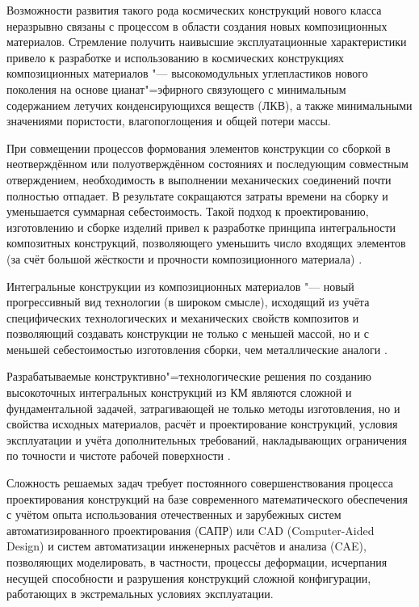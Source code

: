 Возможности развития такого рода космических конструкций нового класса неразрывно связаны с процессом в области создания новых композиционных материалов. Стремление получить наивысшие эксплуатационные характеристики привело к разработке и использованию в космических конструкциях композиционных материалов "--- высокомодульных углепластиков нового поколения на основе цианат"=эфирного связующего с минимальным содержанием летучих конденсирующихся веществ (ЛКВ), а также минимальными значениями пористости, влагопоглощения и общей потери массы.



При совмещении процессов формования элементов конструкции со сборкой в неотверждённом или полуотверждённом состояниях и последующим совместным отверждением, необходимость в выполнении механических соединений почти полностью отпадает. В результате сокращаются затраты времени на сборку и уменьшается суммарная себестоимость. Такой подход к проектированию, изготовлению и сборке изделий привел к разработке принципа интегральности композитных конструкций, позволяющего уменьшить число входящих элементов (за счёт большой жёсткости и прочности композиционного материала) \cite{bit:bib7}.



Интегральные конструкции из композиционных материалов "--- новый прогрессивный вид технологии (в широком смысле), исходящий из учёта специфических технологических и механических свойств композитов и позволяющий создавать конструкции не только с меньшей массой, но и с меньшей себестоимостью изготовления сборки, чем металлические аналоги \cite{bit:bib8}.



 Разрабатываемые конструктивно"=технологические решения по созданию высокоточных интегральных конструкций из КМ являются сложной и фундаментальной задачей, затрагивающей не только методы изготовления, но и свойства исходных материалов, расчёт и проектирование конструкций, условия эксплуатации и учёта дополнительных требований, накладывающих ограничения по точности и чистоте рабочей поверхности \cite{bit:bib2}.



Сложность решаемых задач требует постоянного совершенствования процесса проектирования конструкций на базе современного математического обеспечения с учётом опыта использования отечественных и зарубежных систем автоматизированного проектирования (САПР) или CAD (Computer-Aided Design) и систем автоматизации инженерных расчётов и анализа (CAE), позволяющих моделировать, в частности, процессы деформации, исчерпания несущей способности и разрушения конструкций сложной конфигурации, работающих в экстремальных условиях эксплуатации.



